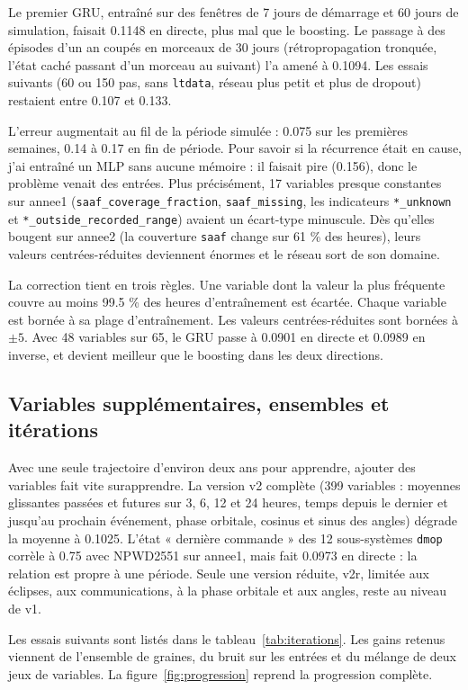 \documentclass[11pt,a4paper]{article}
\newcommand{\code}[1]{\texttt{#1}}
\begin{document}
Le premier GRU, entraîné sur des fenêtres de 7 jours de démarrage et 60 jours de simulation, faisait 0.1148 en directe, plus mal que le boosting. Le passage à des épisodes d'un an coupés en morceaux de 30 jours (rétropropagation tronquée, l'état caché passant d'un morceau au suivant) l'a amené à 0.1094. Les essais suivants (60 ou 150 pas, sans \code{ltdata}, réseau plus petit et plus de dropout) restaient entre 0.107 et 0.133.

L'erreur augmentait au fil de la période simulée : 0.075 sur les premières semaines, 0.14 à 0.17 en fin de période. Pour savoir si la récurrence était en cause, j'ai entraîné un MLP sans aucune mémoire : il faisait pire (0.156), donc le problème venait des entrées. Plus précisément, 17 variables presque constantes sur annee1 (\code{saaf\_coverage\_fraction}, \code{saaf\_missing}, les indicateurs \code{*\_unknown} et \code{*\_outside\_recorded\_range}) avaient un écart-type minuscule. Dès qu'elles bougent sur annee2 (la couverture \code{saaf} change sur 61 \% des heures), leurs valeurs centrées-réduites deviennent énormes et le réseau sort de son domaine.

La correction tient en trois règles. Une variable dont la valeur la plus fréquente couvre au moins 99.5 \% des heures d'entraînement est écartée. Chaque variable est bornée à sa plage d'entraînement. Les valeurs centrées-réduites sont bornées à $\pm 5$. Avec 48 variables sur 65, le GRU passe à 0.0901 en directe et 0.0989 en inverse, et devient meilleur que le boosting dans les deux directions.

\subsection{Variables supplémentaires, ensembles et itérations}

Avec une seule trajectoire d'environ deux ans pour apprendre, ajouter des variables fait vite surapprendre. La version v2 complète (399 variables : moyennes glissantes passées et futures sur 3, 6, 12 et 24 heures, temps depuis le dernier et jusqu'au prochain événement, phase orbitale, cosinus et sinus des angles) dégrade la moyenne à 0.1025. L'état « dernière commande » des 12 sous-systèmes \code{dmop} corrèle à 0.75 avec NPWD2551 sur annee1, mais fait 0.0973 en directe : la relation est propre à une période. Seule une version réduite, v2r, limitée aux éclipses, aux communications, à la phase orbitale et aux angles, reste au niveau de v1.

Les essais suivants sont listés dans le tableau~\ref{tab:iterations}. Les gains retenus viennent de l'ensemble de graines, du bruit sur les entrées et du mélange de deux jeux de variables. La figure~\ref{fig:progression} reprend la progression complète.
\end{document}
